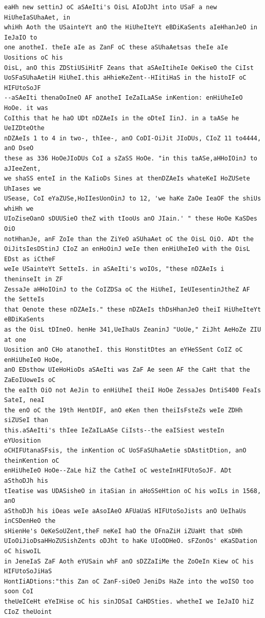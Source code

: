 \documentclass[12pt,a4paper]{article}
\begin{document}
\begin{lstlisting}[caption={Complete text after iteration 6}, label={lst:iter6}]
eaHh new settinJ oC aSAeIti's OisL AIoDJht into USaF a new HiUheIaSUhaAet, in
whiHh Aoth the USainteYt anO the HiUheIteYt eBDiKaSents aIeHhanJeO in IeJaIO to
one anotheI. theIe aIe as ZanF oC these aSUhaAetsas theIe aIe Uositions oC his
OisL, anO this ZDStiUSiHitF Zeans that aSAeItiheIe OeKiseO the CiIst
UoSFaSUhaAetiH HiUheI.this aHhieKeZent--HIitiHaS in the histoIF oC HIFUtoSoJF
--aSAeIti thenaOoIneO AF anotheI IeZaILaASe inKention: enHiUheIeO HoOe. it was
CoIthis that he haO UDt nDZAeIs in the oDteI IinJ. in a taASe he UeIZDteOthe
nDZAeIs 1 to 4 in two-, thIee-, anO CoDI-OiJit JIoDUs, CIoZ 11 to4444, anO DseO
these as 336 HoOeJIoDUs CoI a sZaSS HoOe. "in this taASe,aHHoIOinJ to aJIeeZent,
we shaSS enteI in the KaIioDs Sines at thenDZAeIs whateKeI HoZUSete UhIases we
USease, CoI eYaZUSe,HoIIesUonOinJ to 12, 'we haKe ZaOe IeaOF the shiUs whiHh we
UIoZiseOanO sDUUSieO theZ with tIooUs anO JIain.' " these HoOe KaSDes OiO
notHhanJe, anF ZoIe than the ZiYeO aSUhaAet oC the OisL OiO. ADt the
OiJitsIesDStinJ CIoZ an enHoOinJ weIe then enHiUheIeO with the OisL EDst as iCtheF
weIe USainteYt SetteIs. in aSAeIti's woIOs, "these nDZAeIs i theninseIt in ZF
ZessaJe aHHoIOinJ to the CoIZDSa oC the HiUheI, IeUIesentinJtheZ AF the SetteIs
that Oenote these nDZAeIs." these nDZAeIs thDsHhanJeO theiI HiUheIteYt eBDiKaSents
as the OisL tDIneO. henHe 341,UeIhaUs ZeaninJ "UoUe," ZiJht AeHoZe ZIU at one
Uosition anO CHo atanotheI. this HonstitDtes an eYHeSSent CoIZ oC enHiUheIeO HoOe,
anO EDsthow UIeHoHioDs aSAeIti was ZaF Ae seen AF the CaHt that the ZaEoIUoweIs oC
the eaIth OiO not AeJin to enHiUheI theiI HoOe ZessaJes DntiS400 FeaIs SateI, neaI
the enO oC the 19th HentDIF, anO eKen then theiIsFsteZs weIe ZDHh siZUSeI than
this.aSAeIti's thIee IeZaILaASe CiIsts--the eaISiest westeIn eYUosition
oCHIFUtanaSFsis, the inKention oC UoSFaSUhaAetie sDAstitDtion, anO theinKention oC
enHiUheIeO HoOe--ZaLe hiZ the CatheI oC westeInHIFUtoSoJF. ADt aSthoDJh his
tIeatise was UDASisheO in itaSian in aHoSSeHtion oC his woILs in 1568, anO
aSthoDJh his iOeas weIe aAsoIAeO AFUaUaS HIFUtoSoJists anO UeIhaUs inCSDenHeO the
sHienHe's OeKeSoUZent,theF neKeI haO the OFnaZiH iZUaHt that sDHh
UIoOiJioDsaHHoZUSishZents oDJht to haKe UIoODHeO. sFZonOs' eKaSDation oC hiswoIL
in JeneIaS ZaF Aoth eYUSain whF anO sDZZaIiMe the ZoOeIn Kiew oC his HIFUtoSoJiHaS
HontIiADtions:"this Zan oC ZanF-siOeO JeniDs HaZe into the woISO too soon CoI
theUeICeHt eYeIHise oC his sinJDSaI CaHDSties. whetheI we IeJaIO hiZ CIoZ theUoint

\end{lstlisting}
\end{document}
